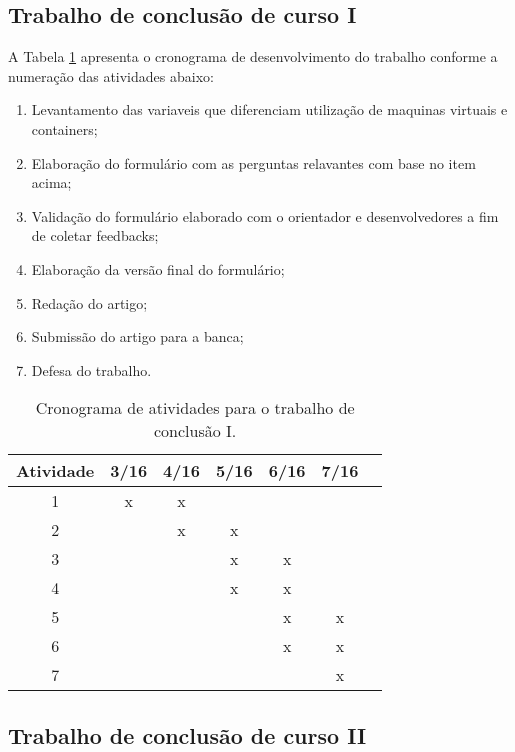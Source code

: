 \documentclass[11pt,a4paper]{article}
\begin{document}
\subsection{Trabalho de conclusão de curso I}

A Tabela \ref{tab:cronograma1} apresenta o cronograma de desenvolvimento do trabalho conforme a numeração das atividades abaixo:
\begin{enumerate}
  \item Levantamento das variaveis que diferenciam utilização de maquinas virtuais e containers;
  \item Elaboração do formulário com as perguntas relavantes com base no item acima;
  \item Validação do formulário elaborado com o orientador e desenvolvedores a fim de coletar feedbacks;
  \item Elaboração da versão final do formulário;
  \item Redação do artigo;
  \item Submissão do artigo para a banca;
  \item Defesa do trabalho.
\end{enumerate}

\begin{table}[h]
  \begin{center}
    \caption{Cronograma de atividades para o trabalho de conclusão I. \label{tab:cronograma1}}
    \begin{tabular}{|c|c|c|c|c|c|c|}
      \hline
      \bf Atividade & \bf 3/16 & \bf 4/16 & \bf 5/16 & \bf 6/16 & \bf 7/16 \\  \hline \hline
      1 & x & x &   &   &   \\ \hline
      2 &   & x & x &   &   \\ \hline
      3 &   &   & x & x &   \\ \hline
      4 &   &   & x & x &   \\ \hline
      5 &   &   &   & x & x \\ \hline
      6 &   &   &   & x & x \\ \hline
      7 &   &   &   &   & x \\ \hline
    \end{tabular}
  \end{center}
\end{table}

\subsection{Trabalho de conclusão de curso II}
\end{document}
